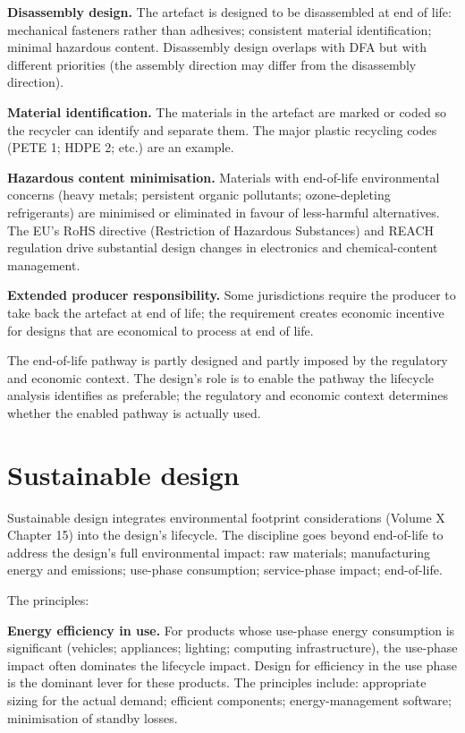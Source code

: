 \textbf{Disassembly design.} The artefact is designed to be disassembled at end of life: mechanical fasteners rather than adhesives; consistent material identification; minimal hazardous content. Disassembly design overlaps with DFA but with different priorities (the assembly direction may differ from the disassembly direction).

\textbf{Material identification.} The materials in the artefact are marked or coded so the recycler can identify and separate them. The major plastic recycling codes (PETE 1; HDPE 2; etc.) are an example.

\textbf{Hazardous content minimisation.} Materials with end-of-life environmental concerns (heavy metals; persistent organic pollutants; ozone-depleting refrigerants) are minimised or eliminated in favour of less-harmful alternatives. The EU's RoHS directive (Restriction of Hazardous Substances) and REACH regulation drive substantial design changes in electronics and chemical-content management.

\textbf{Extended producer responsibility.} Some jurisdictions require the producer to take back the artefact at end of life; the requirement creates economic incentive for designs that are economical to process at end of life.

The end-of-life pathway is partly designed and partly imposed by the regulatory and economic context. The design's role is to enable the pathway the lifecycle analysis identifies as preferable; the regulatory and economic context determines whether the enabled pathway is actually used.

\section{Sustainable design}

Sustainable design integrates environmental footprint considerations (Volume X Chapter 15) into the design's lifecycle. The discipline goes beyond end-of-life to address the design's full environmental impact: raw materials; manufacturing energy and emissions; use-phase consumption; service-phase impact; end-of-life.

The principles:

\textbf{Energy efficiency in use.} For products whose use-phase energy consumption is significant (vehicles; appliances; lighting; computing infrastructure), the use-phase impact often dominates the lifecycle impact. Design for efficiency in the use phase is the dominant lever for these products. The principles include: appropriate sizing for the actual demand; efficient components; energy-management software; minimisation of standby losses.

